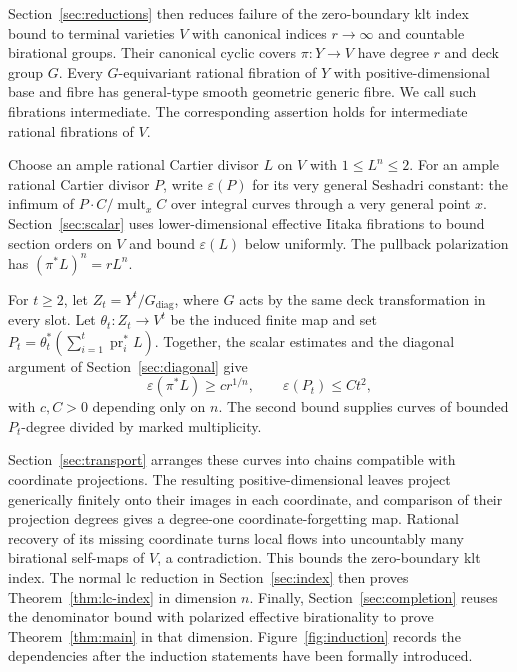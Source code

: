 Section~\ref{sec:reductions} then reduces failure of the zero-boundary
klt index bound to terminal varieties $V$ with canonical indices
$r\to\infty$ and countable birational groups. Their canonical cyclic
covers $\pi:Y\to V$ have degree $r$ and deck group $G$. Every
$G$-equivariant rational fibration of $Y$ with positive-dimensional
base and fibre has general-type smooth geometric generic fibre.
We call such fibrations intermediate. The corresponding assertion holds for
intermediate rational fibrations of $V$.

Choose an ample rational Cartier divisor $L$ on $V$ with
$1\le L^n\le2$. For an ample rational Cartier divisor $P$, write
$\varepsilon(P)$ for its very general Seshadri constant: the infimum
of $P\cdot C/\operatorname{mult}_xC$ over integral curves through a
very general point $x$. Section~\ref{sec:scalar} uses lower-dimensional
effective Iitaka fibrations to bound section orders on $V$ and bound
$\varepsilon(L)$ below uniformly. The pullback polarization has
$(\pi^*L)^n=rL^n$.

For $t\ge2$, let $Z_t=Y^t/G_{\mathrm{diag}}$, where $G$ acts by
the same deck transformation in every slot. Let
$\theta_t:Z_t\to V^t$ be the induced finite map and set
$P_t=\theta_t^*(\sum_{i=1}^t\operatorname{pr}_i^*L)$.
Together, the scalar estimates and the diagonal argument of
Section~\ref{sec:diagonal} give
\[
       \varepsilon(\pi^*L)\ge c r^{1/n},
       \qquad \varepsilon(P_t)\le Ct^2,
\]
with $c,C>0$ depending only on $n$. The second bound supplies curves
of bounded $P_t$-degree divided by marked multiplicity.

Section~\ref{sec:transport} arranges these curves into chains compatible
with coordinate projections. The resulting positive-dimensional
leaves project generically finitely onto their images in each
coordinate, and comparison of their projection degrees gives a
degree-one coordinate-forgetting map.
Rational recovery of its missing coordinate turns local flows into
uncountably many birational self-maps of $V$, a contradiction. This
bounds the zero-boundary klt index. The normal lc reduction in
Section~\ref{sec:index} then proves Theorem~\ref{thm:lc-index} in
dimension $n$. Finally, Section~\ref{sec:completion} reuses the
denominator bound with polarized effective birationality to prove
Theorem~\ref{thm:main} in that dimension. Figure~\ref{fig:induction}
records the dependencies after the induction statements have been
formally introduced.
